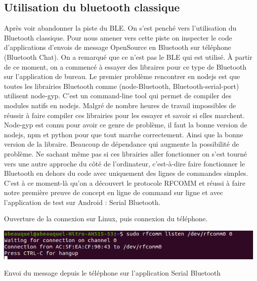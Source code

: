 \documentclass[12pt,fleqn]{article}
\begin{document}
\subsection{Utilisation du bluetooth classique}
Après voir abandonner la piste du BLE. On s'est penché vers l'utilisation du Bluetooth classique. Pour nous amener vers cette piste on inspecter le code d'applications d'envois de message OpenSource en Bluetooth sur téléphone (Bluetooth Chat). On a remarqué que ce n'est pas le BLE qui est utilisé. À partir de ce moment, on a commencé à essayer des libraires pour ce type de Bluetooth sur l'application de bureau. Le premier problème rencontrer en nodejs est que toutes les librairies Bluetooth comme (node-Bluetooth, Bluetooth-serial-port) utilisent node-gyp. C'est un command-line tool qui permet de compiler des modules natifs en nodejs. Malgré de nombre heures de travail impossibles de réussir à faire compiler ces librairies pour les essayer et savoir si elles marchent. Node-gyp est connu pour avoir ce genre de problème, il faut la bonne version de nodejs, npm et python pour que tout marche correctement. Ainsi que la bonne version de la libraire. Beaucoup de dépendance qui augmente la possibilité de problème. Ne sachant même pas si ces librairies aller fonctionner on s'est tourné vers une autre approche du côté de l'ordinateur, c'est-à-dire faire fonctionner le Bluetooth en dehors du code avec uniquement des lignes de commandes simples. C'est à ce moment-là qu'on a découvert le protocole RFCOMM et réussi à faire notre première preuve de concept en ligne de command sur ligne et avec l'application de test sur Android : Serial Bluetooth.

Ouverture de la connexion sur Linux, puis connexion du téléphone.

\includegraphics[scale=0.7]{images/rfcomm_connection_linux.png}


Envoi du message depuis le téléphone sur l'application Serial Bluetooth
\end{document}

